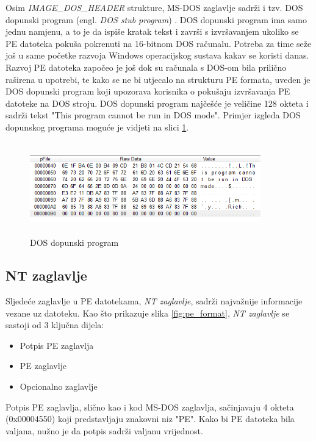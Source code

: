 \documentclass[times, utf8, diplomski, numeric]{fer}
\begin{document}
Osim \emph{IMAGE\_DOS\_HEADER} strukture, MS-DOS zaglavlje sadrži
i tzv. DOS dopunski program (engl. \emph{DOS stub
program}) \citep{dos_stub}. DOS dopunski program ima samo jednu
namjenu, a to je da ispiše kratak tekst i završi s izvršavanjem
ukoliko se PE datoteka pokuša pokrenuti na 16-bitnom DOS računalu.
Potreba za time seže još u same početke razvoja Windows
operacijskog sustava kakav se koristi danas. Razvoj PE datoteka
započeo je još dok su računala s DOS-om bila prilično raširena u
upotrebi, te kako se ne bi utjecalo na strukturu PE formata,
uveden je DOS dopunski program koji upozorava korisnika o
pokušaju izvršavanja PE datoteke na DOS stroju. DOS dopunski
program najčešće je veličine 128 okteta i sadrži tekst "This
program cannot be run in DOS mode". Primjer izgleda DOS dopunskog
programa moguće je vidjeti na slici \ref{fig:dos_stub}.

\begin{figure}[!ht]
\centering
\setlength\fboxsep{0pt}
\setlength\fboxrule{0.5pt}
\includegraphics[width=10cm, height=4cm]{slike/dos_stub}
\caption{DOS dopunski program}
\label{fig:dos_stub} 
\end{figure}

\subsection{NT zaglavlje}

Sljedeće zaglavlje u PE datotekama, \emph{NT zaglavlje}, sadrži
najvažnije informacije vezane uz datoteku. Kao što prikazuje
slika \ref{fig:pe_format}, \emph{NT zaglavlje} se sastoji od 3
ključna dijela:

\begin{itemize}
\item Potpis PE zaglavlja
\item PE zaglavlje
\item Opcionalno zaglavlje
\end{itemize} 

Potpis PE zaglavlja, slično kao i kod MS-DOS zaglavlja,
sačinjavaju 4 okteta (0x00004550) koji predstavljaju znakovni niz
"PE". Kako bi PE datoteka bila valjana, nužno je da potpis
sadrži valjanu vrijednost. 
\end{document}
